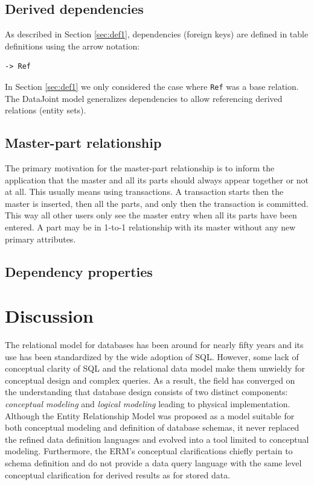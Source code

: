 \documentclass[letter,10pt]{article}
\begin{document}
\subsection{Derived dependencies}\label{sec:dep}
As described in Section \ref{sec:def1}, dependencies (foreign keys) are defined in table definitions using the arrow notation:
\begin{lstlisting}
-> Ref
\end{lstlisting}
In Section \ref{sec:def1} we only considered the case where \lstinline$Ref$ was a base relation. 
The DataJoint model generalizes dependencies to allow referencing derived relations (entity sets).

\subsection{Master-part relationship}
The primary motivation for the master-part relationship is to inform the application that the master and all its parts should always appear together or not at all.  
This usually means using transactions.  
A transaction starts then the master is inserted, then all the parts, and only then the transaction is committed.  
This way all other users only see the master entry when all its parts have been entered.
A part may be in 1-to-1 relationship with its master without any new primary attributes.

\subsection{Dependency properties}

\section{Discussion}
The relational model for databases has been around for nearly fifty years and its use has been standardized by the wide adoption of SQL.
However, some lack of conceptual clarity of SQL and the relational data model make them unwieldy for conceptual design and complex queries.
As a result, the field has converged on the understanding that database design consists of two distinct components: \emph{conceptual modeling} and \emph{logical modeling} leading to physical implementation. 
Although the Entity Relationship Model was proposed as a model suitable for both conceptual modeling and definition of database schemas, it never replaced the refined data definition languages and evolved into a tool limited to conceptual modeling.  
Furthermore, the ERM's conceptual clarifications chiefly pertain to schema definition and do not provide a data query language with the same level conceptual clarification for derived results as for stored data.
\end{document}
